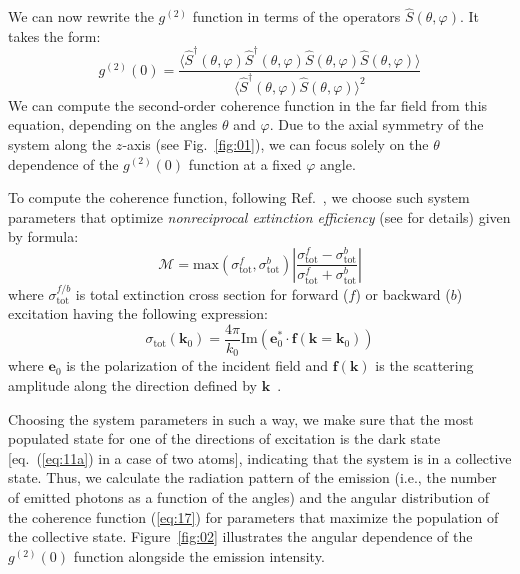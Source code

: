 \documentclass[aps,prl,twocolumn,superscriptaddress,showpacs,amsmath,amssymb]{revtex4-2}
\begin{document}
We can now rewrite the $g^{(2)}$ function in terms of the operators $\hat{S}(\theta, \varphi)$. It takes the form:
\begin{equation}
    \label{eq:17}
    g^{(2)}(0) = \frac{\langle \hat{S}^\dagger(\theta, \varphi)\hat{S}^\dagger(\theta, \varphi)\hat{S}(\theta, \varphi)\hat{S}(\theta, \varphi) \rangle}{\langle \hat{S}^\dagger(\theta, \varphi)\hat{S}(\theta, \varphi) \rangle^2}
\end{equation}
We can compute the second-order coherence function in the far field from this equation, depending on the angles $\theta$ and $\varphi$. Due to the axial symmetry of the system along the $z$-axis (see Fig.~\ref{fig:01}), we can focus solely on the $\theta$ dependence of the $g^{(2)}(0)$ function at a fixed $\varphi$ angle.

To compute the coherence function, following Ref.~\cite{nefedkin2023nonreciprocal}, we choose such system parameters that optimize \textit{nonreciprocal extinction efficiency} (see \cite{nefedkin2023nonreciprocal} for details) given by formula:
\begin{equation}
    \label{eq:17a}
\mathcal{M} = \mathrm{max}\left( \sigma_\mathrm{tot}^f, \sigma_\mathrm{tot}^b \right) \left| \frac{\sigma_\mathrm{tot}^f - \sigma_\mathrm{tot}^b}{\sigma_\mathrm{tot}^f + \sigma_\mathrm{tot}^b} \right|
\end{equation}
where $\sigma_\mathrm{tot}^{f/b}$ is total extinction cross section for forward ($f$) or backward ($b$) excitation having the following expression:
\begin{equation}
    \label{eq:17b}
    \sigma_\mathrm{tot}(\mathbf{k}_0) = \frac{4 \pi}{k_0} \mathrm{Im} \left( \mathbf{e}_0^* \cdot \mathbf{f}(\mathbf{k} = \mathbf{k}_0) \right)
\end{equation}
where $\mathbf{e}_0$ is the polarization of the incident field and $\mathbf{f}(\mathbf{k})$ is the scattering amplitude along the direction defined by $\mathbf{k}$~\cite{jackson1999classical}.

Choosing the system parameters in such a way, we make sure that the most populated state for one of the directions of excitation is the dark state [eq.~(\ref{eq:11a}) in a case of two atoms], indicating that the system is in a collective state. 
Thus, we calculate the radiation pattern of the emission (i.e., the number of emitted photons as a function of the angles) and the angular distribution of the coherence function (\ref{eq:17}) for parameters that maximize the population of the collective state. 
Figure~\ref{fig:02} illustrates the angular dependence of the $g^{(2)}(0)$ function alongside the emission intensity.
\end{document}
